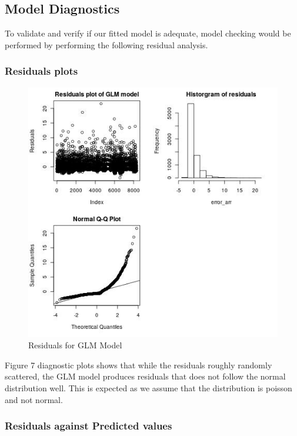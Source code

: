 \documentclass[12pt, letterpaper] {article}
\begin{document}
\subsection{Model Diagnostics}
To validate and verify if our fitted model is adequate, model checking would be performed by performing the following residual analysis.	

\subsubsection{Residuals plots}

\begin{figure}[H]
    \centering
    \includegraphics[width=\textwidth, height=0.4\textheight]{Images/Full_GLM_resids.jpg}
    \caption{Residuals for GLM Model}
    \label{fig:Residuals for GLM Model}
\end{figure}

\noindent Figure 7 diagnostic plots shows that while the residuals roughly randomly scattered, the GLM model produces residuals that does not follow the normal distribution well. This is expected as we assume that the distribution is poisson and not normal. 

\subsubsection{Residuals against Predicted values}
\end{document}
